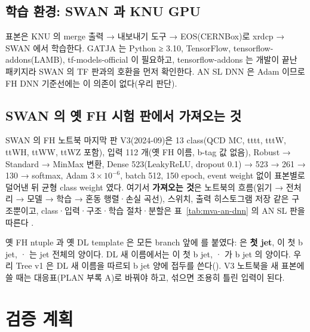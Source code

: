 \subsection{학습 환경: SWAN 과 KNU GPU}\label{sec:mva-ours-env}

표본은 KNU  의 merge 출력 → 내보내기 도구 → EOS(CERNBox)로 xrdcp → SWAN 에서 학습한다. GATJA 는
Python ≥ 3.10, TensorFlow, tensorflow-addons(LAMB), tf-models-official 이 필요하고, tensorflow-addons 는 개발이 끝난 패키지라 SWAN 의 TF 판과의 호환을
먼저 확인한다. AN SL DNN 은 Adam 이므로 FH DNN 기준선에는 이 의존이 없다(우리 판단).

\subsection{SWAN 의 옛 FH 시험 판에서 가져오는 것}\label{sec:mva-ours-swan}

SWAN 의 FH 노트북 마지막 판 V3(2024-09)은 13 class(QCD MC, tttt, tttW, ttWH, ttWW, ttWZ 포함), 입력 112 개(옛 FH 이름, b-tag 값 없음),
Robust → Standard → MinMax 변환, Dense 523(LeakyReLU, dropout 0.1) → 523 → 261 → 130 → softmax, Adam $3\times10^{-6}$, batch 512, 150 epoch,
event weight 없이 표본별로 덜어낸 뒤 균형 class weight 였다. 여기서 \textbf{가져오는 것}은 노트북의 흐름(읽기 → 전처리 → 모델 →
학습 → 혼동 행렬·손실 곡선),  스위치, 출력 히스토그램 저장 같은 구조뿐이고, class·입력·구조·학습 절차·분할은 표~\ref{tab:mva-an-dnn} 의
AN SL 판을 따른다 \tagan.

\begin{andiff}[이름 함정 — 옛 FH ntuple 과 DL 새 이름]
옛 FH ntuple 과 옛 DL template 은 모든 branch 앞에  를 붙였다:  은 \textbf{첫 jet},  이 첫 b jet, · 는
jet 전체의 양이다. DL 새 이름에서는  이 첫 b jet, · 가 b jet 의 양이다. 우리 Tree v1 은 DL 새 이름을 따르되 b jet 양에
 접두를 쓴다(). V3 노트북을 새 표본에 쓸 때는 대응표(PLAN 부록 A)로 바꿔야 하고, 섞으면 조용히 틀린 입력이 된다.
\end{andiff}

\section{검증 계획}\label{sec:mva-validation}


